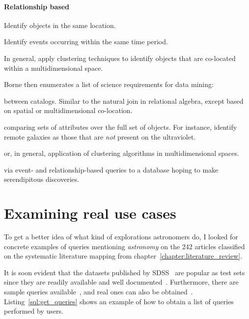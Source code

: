 \paragraph{Relationship based}

\begin{description}[leftmargin=1cm, labelindent=0.5cm]
    \item[Spatial]
        Identify objects in the same location.
    \item[Temporal]
        Identify events occurring within the same time period.
    \item[Coincidence]
        In general, apply clustering techniques to
        identify objects that are co-located within a multidimensional space.
\end{description}

Borne then enumerates a list of science requirements for data mining:

\begin{description}[leftmargin=1cm, labelindent=0.5cm]
    \item[Object Cross-Identification] between catalogs. Similar to the natural join
        in relational algebra, except based on spatial or multidimensional co-location.
    \item[Object Cross-Correlation] comparing sets of attributes over the full set of objects.
        For instance, identify remote galaxies as those that are \emph{not} present on the ultraviolet.
    \item[Nearest-neighbor identification] or, in general, application of clustering algorithms in multidimensional spaces.
    \item[Systematic Data Exploration] via event- and relationship-based queries to a database
        hoping to make serendipitous discoveries.
\end{description}

\section{Examining real use cases}

To get a better idea of what kind of explorations astronomers do, I looked for
concrete examples of queries mentioning \emph{astronomy} on the 242 articles classified on
the systematic literature mapping from chapter~\ref{chapter:literature_review}.

It is soon evident that the datasets published by \gls{SDSS}~\cite{SDSS14} are popular as test
sets since they are readily available and well documented~\cite{Gray2002}.
Furthermore, there are sample queries available~\cite{SDSSSamples}, and real ones can also be
obtained~\cite{SDSSSqlLogs}. Listing~\ref{sql:get_queries} shows an example of how to obtain a list
of queries performed by users.

